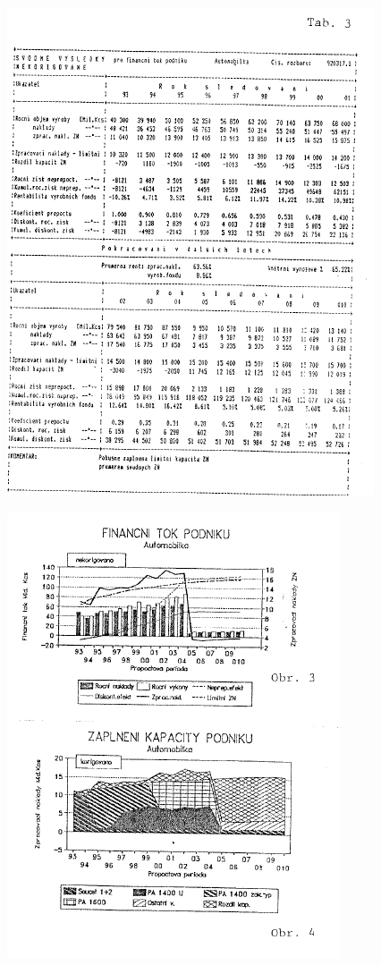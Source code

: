 \documentclass [10pt, fancyhdr, twoside] {article}
\begin{document}
\includegraphics[width=\textwidth,height=\textheight,keepaspectratio]{./vesna-obr2.png}

\includegraphics[width=\textwidth,height=\textheight,keepaspectratio]{./vesna-obr3.png}
\end{document}
